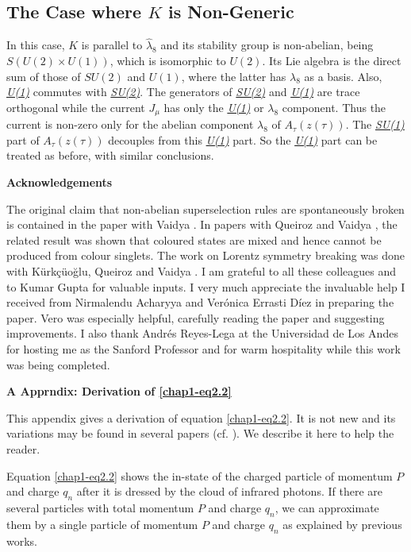 \subsection{The Case where $K$ is Non-Generic}\label{chap1-sec4.1}

In this case, $K$ is parallel to $\hat{\lambda}_8$ and its stability group is non-abelian, being $S(U(2) \times U(1))$, which is isomorphic to $U(2)$. Its Lie algebra is the direct sum of those of $SU(2)$ and $U(1)$, where the latter has $\lambda_8$ as a basis. Also, \underline{\textit{U(1)}} commutes with \underline{\textit{SU(2)}}. The generators of \underline{\textit{SU(2)}} and \underline{\textit{U(1)}} are trace orthogonal while the current $J_\mu$ has only the \underline{\textit{U(1)}} or $\lambda_8$ component. Thus the current is non-zero only for the abelian component $\lambda_8$ of $A_\tau(z (\tau))$. The \underline{\textit{SU(1)}} part of $A_\tau (z(\tau))$ decouples from this \underline{\textit{U(1)}} part. So the \underline{\textit{U(1)}} part can be treated as before, with similar conclusions.

\noindent \textbf{\large Acknowledgements}
\medskip

The original claim that non-abelian superselection rules are spontaneously broken is contained in the paper with Vaidya \cite{key1}. In papers with Queiroz and Vaidya \cite{key10, key13}, the related result was shown that coloured states are mixed and hence cannot be produced from colour singlets. The work on Lorentz symmetry breaking was done with K\"urk\c{c}\"{u}o\u{g}lu, Queiroz and Vaidya \cite{key4}. I am grateful to all these colleagues and to Kumar Gupta for valuable inputs. I very much appreciate the invaluable help I received from Nirmalendu Acharyya and Ver\'onica Errasti D\'iez in preparing the paper. Vero was especially helpful, carefully reading the paper and suggesting improvements. I also thank Andr\'es Reyes-Lega at the Universidad de Los Andes for hosting me as the Sanford Professor and for warm hospitality while this work was being completed.

\medskip
\noindent \textbf{\large A Apprndix: Derivation of \eqref{chap1-eq2.2}}
\medskip

This appendix gives a derivation of equation \eqref{chap1-eq2.2}. It is not new and its variations may be found in several papers (cf. \cite{key3, key6, key14}). We describe it here to help the reader.

Equation \eqref{chap1-eq2.2} shows the in-state of the charged particle of momentum $P$ and charge $q_n$ after it is dressed by the cloud of infrared photons. If there are several particles with total momentum $P$ and charge $q_n$, we can approximate them by a single particle of momentum $P$ and charge $q_n$ as explained by previous works.

